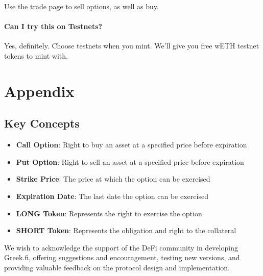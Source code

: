 \documentclass[%
 reprint,
 amsmath,amssymb,
 aps,
]{revtex4-2}
\begin{document}
Use the trade page to sell options, as well as buy.

\paragraph{Can I try this on Testnets?}

Yes, definitely. Choose testnets when you mint. We'll give you free wETH
testnet tokens to mint with.

\section{\label{sec:appendix}Appendix}

\subsection{Key Concepts}

\begin{itemize}
\item
  \textbf{Call Option}: Right to buy an asset at a specified price
  before expiration
\item
  \textbf{Put Option}: Right to sell an asset at a specified price
  before expiration
\item
  \textbf{Strike Price}: The price at which the option can be exercised
\item
  \textbf{Expiration Date}: The last date the option can be exercised
\item
  \textbf{LONG Token}: Represents the right to exercise the option
\item
  \textbf{SHORT Token}: Represents the obligation and right to the
  collateral
\end{itemize}

\begin{acknowledgments}
We wish to acknowledge the support of the DeFi community in developing
Greek.fi, offering suggestions and encouragement, testing new versions,
and providing valuable feedback on the protocol design and implementation.
\end{acknowledgments}
\end{document}
